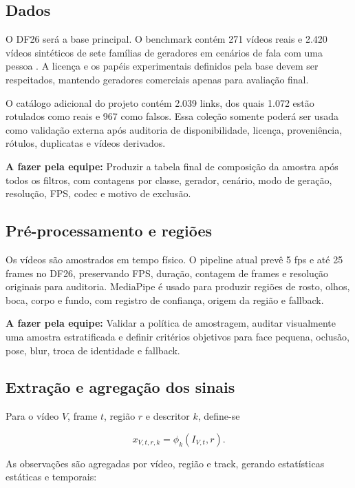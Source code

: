 \documentclass[11pt,a4paper]{article}
\newcommand{\afazer}[1]{%
  \par\smallskip
  \noindent\textcolor{red!70!black}{\textbf{A fazer pela equipe:} #1}
  \par\smallskip
}
\begin{document}
\subsection{Dados}

O DF26 será a base principal. O benchmark contém 271 vídeos reais e 2.420
vídeos sintéticos de sete famílias de geradores em cenários de fala com uma
pessoa \cite{shykula2026df26}. A licença e os papéis experimentais definidos
pela base devem ser respeitados, mantendo geradores comerciais apenas para
avaliação final.

O catálogo adicional do projeto contém 2.039 links, dos quais 1.072 estão
rotulados como reais e 967 como falsos. Essa coleção somente poderá ser usada
como validação externa após auditoria de disponibilidade, licença, proveniência,
rótulos, duplicatas e vídeos derivados.

\afazer{Produzir a tabela final de composição da amostra após todos os filtros,
com contagens por classe, gerador, cenário, modo de geração, resolução, FPS,
codec e motivo de exclusão.}

\subsection{Pré-processamento e regiões}

Os vídeos são amostrados em tempo físico. O pipeline atual prevê 5 fps e até 25
frames no DF26, preservando FPS, duração, contagem de frames e resolução
originais para auditoria. MediaPipe é usado para produzir regiões de rosto,
olhos, boca, corpo e fundo, com registro de confiança, origem da região e
fallback.

\afazer{Validar a política de amostragem, auditar visualmente uma amostra
estratificada e definir critérios objetivos para face pequena, oclusão, pose,
blur, troca de identidade e fallback.}

\subsection{Extração e agregação dos sinais}

Para o vídeo $V$, frame $t$, região $r$ e descritor $k$, define-se

\begin{equation}
  x_{V,t,r,k}=\phi_k(I_{V,t},r).
\end{equation}

As observações são agregadas por vídeo, região e track, gerando estatísticas
estáticas e temporais:
\end{document}
